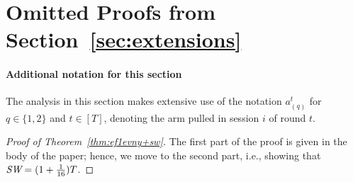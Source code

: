 \section{Omitted Proofs from Section~\ref{sec:extensions}}
\newcommand{\at}[1]{a_{#1}^t}
\paragraph{Additional notation for this section} The analysis in this section makes extensive use of the notation $\at{(q)}$ for $q \in\{1,2\}$ and $t\in [T]$, denoting the arm pulled in session $i$ of round $t$. 
\begin{proof}[Proof of Theorem~\ref{thm:ef1evny+sw}]
The first part of the proof is given in the body of the paper; hence, we move to the second part, i.e., showing that $\textit{SW} = (1+\frac{1}{16})T$.


\end{proof}
